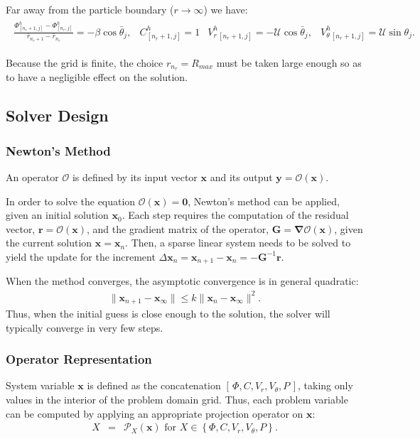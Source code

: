 \documentclass[10pt]{ijnam}
\newcommand\bnabla{\boldsymbol{\nabla}}
\newcommand\bG{\boldsymbol{G}}
\newcommand\bx{\boldsymbol{x}}
\newcommand\by{\boldsymbol{y}}
\newcommand\br{\boldsymbol{r}}
\newcommand\bzero{\boldsymbol{0}}
\newcommand\cO{\mathcal{O}}
\newcommand\cP{\mathcal{P}}
\newcommand\cU{\mathscr{U}}
\begin{document}
Far away from the particle boundary ($r\rightarrow\infty$) we have:
\begin{eqnarray*}
\begin{array}{cccc}
\frac{\varPhi^h_{[n_r + 1, j]} - \varPhi^h_{[n_r, j]}}{\bar{r}_{n_r + 1} - \bar{r}_{n_r}} 
= -\beta \cos\bar{\theta}_j, &
C^h_{[n_r + 1, j]} = 1 &
V_r^h{}_{[n_r + 1, j]} = -\cU \cos\bar{\theta}_j, &
V_\theta^h{}_{[n_r + 1, j]} = \cU \sin\theta_j.
\end{array}\end{eqnarray*}

Because the grid is finite, the choice 
$r_{n_r} = R_{max}$ must be taken large enough so as to have a negligible effect
on the solution.

\subsection{Solver Design}
\subsubsection{Newton's Method}
An operator $\cO$ is defined by its input vector $\bx$ and its output 
$\by = \cO(\bx)$.

In order to solve the equation $\cO(\bx) = \bzero$, Newton's method can 
be applied, given an initial solution $\bx_0$.
Each step requires the computation of the residual vector, $\br = \cO(\bx)$, and
the gradient matrix of the operator, $\bG = \bnabla \cO(\bx)$, 
given the current solution $\bx = \bx_n$.
Then, a sparse linear system needs to be solved to yield the update for the 
increment $\Delta \bx_n = \bx_{n+1} - \bx_n = -\bG^{-1} \br$.

When the method converges, 
the asymptotic convergence is in general quadratic:
\begin{eqnarray*}
\|\bx_{n+1} - \bx_\infty\| \le k \|\bx_{n} - \bx_\infty\|^2.
\end{eqnarray*}
Thus, when the initial guess is close enough to the solution, the solver
will typically converge in very few steps.

\subsubsection{Operator Representation}
System variable $\bx$ is defined as the concatenation $[\,\varPhi, C, V_r, V_\theta, P\,]$,
taking only values in the interior of the problem domain grid.
Thus, each problem variable can be computed by applying an appropriate projection operator on $\bx$:
\begin{eqnarray*}
X &=& \cP_X(\bx) \mbox{ for } X \in \left\{\varPhi, C, V_r, V_\theta, P\right\}.
\end{eqnarray*}
\end{document}
